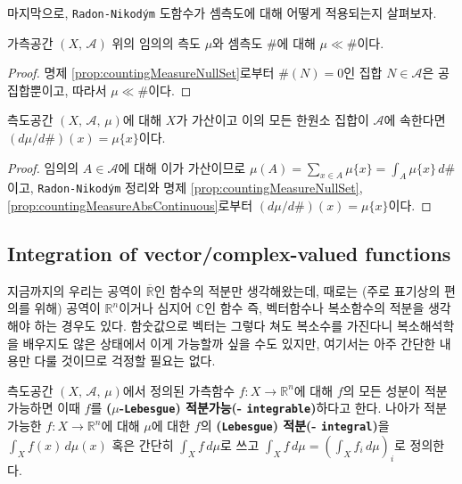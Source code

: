 마지막으로, \texttt{Radon-Nikod\'ym} 도함수가 셈측도에 대해 어떻게 적용되는지 살펴보자.

\begin{proposition}\label{prop:countingMeasureAbsContinuous}
    가측공간 $(X,\,\mathcal{A})$ 위의 임의의 측도 $\mu$와 셈측도 $\#$에 대해 $\mu\ll\#$이다.
\end{proposition}

\begin{proof}
    명제 \ref{prop:countingMeasureNullSet}로부터 $\#(N)=0$인 집합 $N\in\mathcal{A}$은 공집합뿐이고, 따라서 $\mu\ll\#$이다.
\end{proof}

\begin{theorem}
    측도공간 $(X,\,\mathcal{A},\,\mu)$에 대해 $X$가 가산이고 이의 모든 한원소 집합이 $\mathcal{A}$에 속한다면 $(d\mu/d\#)(x)=\mu\{x\}$이다.
\end{theorem}

\begin{proof}
    임의의 $A\in\mathcal{A}$에 대해 이가 가산이므로 $\mu(A)=\sum_{x\in A}\mu\{x\}=\int_A\mu\{x\}\,d\#$이고, \texttt{Radon-Nikod\'ym} 정리와 명제 \ref{prop:countingMeasureNullSet}, \ref{prop:countingMeasureAbsContinuous}로부터 $(d\mu/d\#)(x)=\mu\{x\}$이다.
\end{proof}

\subsection{Integration of vector/complex-valued functions}

지금까지의 우리는 공역이 $\overline{\mathbb{R}}$인 함수의 적분만 생각해왔는데, 때로는 (주로 표기상의 편의를 위해) 공역이 $\mathbb{R}^n$이거나 심지어 $\mathbb{C}$인 함수 즉, 벡터함수나 복소함수의 적분을 생각해야 하는 경우도 있다. 함숫값으로 벡터는 그렇다 쳐도 복소수를 가진다니 복소해석학을 배우지도 않은 상태에서 이게 가능할까 싶을 수도 있지만, 여기서는 아주 간단한 내용만 다룰 것이므로 걱정할 필요는 없다.

\begin{definition}
    측도공간 $(X,\,\mathcal{A},\,\mu)$에서 정의된 가측함수 $f:X\to\mathbb{R}^n$에 대해 $f$의 모든 성분이 적분가능하면 이때 $f$를 \textbf{($\mu$-\texttt{Lebesgue}) 적분가능(- \texttt{integrable})}하다고 한다. 나아가 적분가능한 $f:X\to\mathbb{R}^n$에 대해 $\mu$에 대한 $f$의 \textbf{(\texttt{Lebesgue}) 적분(- \texttt{integral})}을 $\int_Xf(x)\,d\mu(x)$ 혹은 간단히 $\int_Xf\,d\mu$로 쓰고 $\int_Xf\,d\mu=(\int_Xf_i\,d\mu)_i$로 정의한다.
\end{definition}

